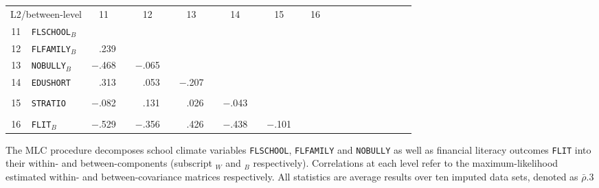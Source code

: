 {\begin{tabular}{cl rc rc rc rc rc rc rc rc rc rc}
        \cmidrule[0.08em]{1-14}    \multicolumn{2}{c}{L2/between-level} & \multicolumn{1}{c}{11} &       & \multicolumn{1}{c}{12} &       & \multicolumn{1}{c}{13} &       & \multicolumn{1}{c}{14} &       & \multicolumn{1}{c}{15} &       & \multicolumn{1}{c}{16} &       &       &       &       &       &       &       &       &  \\
        \cmidrule[0.06em]{1-14}    11    & \texttt{FLSCHOOL}$_B$ &       &       &       &       &       &       &       &       &       &       &       &       &       &       &       &       &       &       &       &  \\
            12    & \texttt{FLFAMILY}$_B$ & \cellcolor[rgb]{ .765,  .765,  1}.239 &       &       &       &       &       &       &       &       &       &       &       &       &       &       &       &       &       &       &  \\
            13    & \texttt{NOBULLY}$_B$ & \cellcolor[rgb]{ 1,  .529,  .529}$-.$468 &       & \cellcolor[rgb]{ 1,  .933,  .933}$-.$065 &       &       &       &       &       &       &       &       &       &       &       &       &       &       &       &       &  \\
            14    & \texttt{EDUSHORT} & \cellcolor[rgb]{ .69,  .69,  1}.313 &       & \cellcolor[rgb]{ .949,  .949,  1}.053 &       & \cellcolor[rgb]{ 1,  .792,  .792}$-.$207 &       &       &       &       &       &       &       &       &       &       &       &       &       &       &  \\
                  &       &       &       &       &       &       &       &       &       &       &       &       &       &       &       &       &       &       &       &       &  \\
            15    & \texttt{STRATIO} & \cellcolor[rgb]{ 1,  .918,  .918}$-.$082 &       & \cellcolor[rgb]{ .871,  .871,  1}.131 &       & \cellcolor[rgb]{ .976,  .976,  1}.026 &       & \cellcolor[rgb]{ 1,  .957,  .957}$-.$043 &       &       &       &       &       &       &       &       &       &       &       &       &  \\
                  &       &       &       &       &       &       &       &       &       &       &       &       &       &       &       &       &       &       &       &       &  \\
            16    & \texttt{FLIT}$_B$  & \cellcolor[rgb]{ 1,  .471,  .471}$-.$529 &       & \cellcolor[rgb]{ 1,  .643,  .643}$-.$356 &       & \cellcolor[rgb]{ .576,  .576,  1}.426 &       & \cellcolor[rgb]{ 1,  .561,  .561}$-.$438 &       & \cellcolor[rgb]{ 1,  .898,  .898}$-.$101 &       &       &       &       &       &       &       &       &       &       &  \\
        \cmidrule[0.08em]{1-14}    \end{tabular}%
}{The MLC procedure decomposes school climate variables \texttt{FLSCHOOL}, \texttt{FLFAMILY} and \texttt{NOBULLY} as well as financial literacy outcomes \texttt{FLIT} into their within- and between-components (subscript $_W$ and $_B$ respectively). Correlations at each level refer to the maximum-likelihood estimated within- and between-covariance matrices respectively. All statistics are average results over ten imputed data sets, denoted as $\bar{\rho}$.}{3}
